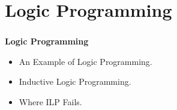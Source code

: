 \documentclass[bigger,xcolor={x11names,svgnames}]{beamer}
\begin{document}
\section{Logic Programming}
%
\begin{frame}
    \frametitle{}
    \begin{center}
        \vfill
        {\huge\bf Logic Programming}
    \end{center}
    \vfill
    \begin{itemize}
        \item An Example of Logic Programming.
        \item Inductive Logic Programming.
        \item Where ILP Fails.
    \end{itemize}
    \vfill
\end{frame}
%
\end{document}
